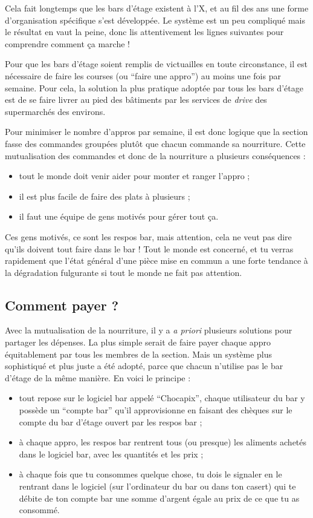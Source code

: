 \documentclass[12pt,french]{article}
\begin{document}
Cela fait longtemps que les bars d'étage existent à l'X, et au fil des ans une forme d'organisation spécifique s'est développée. Le système est un peu compliqué mais le résultat en vaut la peine, donc lis attentivement les lignes suivantes pour comprendre comment ça marche !

Pour que les bars d'étage soient remplis de victuailles en toute circonstance, il est nécessaire de faire les courses (ou \enquote{faire une appro}) au moins une fois par semaine. Pour cela, la solution la plus pratique adoptée par tous les bars d'étage est de se faire livrer au pied des bâtiments par les services de \emph{drive} des supermarchés des environs.

Pour minimiser le nombre d'appros par semaine, il est donc logique que la section fasse des commandes groupées plutôt que chacun commande sa nourriture. Cette mutualisation des commandes et donc de la nourriture a plusieurs conséquences :
\begin{itemize}
	\item tout le monde doit venir aider pour monter et ranger l'appro ;
	\item il est plus facile de faire des plats à plusieurs ;
	\item il faut une équipe de gens motivés pour gérer tout ça.
\end{itemize}

Ces gens motivés, ce sont les respos bar, mais attention, cela ne veut pas dire qu'ils doivent tout faire dans le bar ! Tout le monde est concerné, et tu verras rapidement que l'état général d'une pièce mise en commun a une forte tendance à la dégradation fulgurante si tout le monde ne fait pas attention.

\subsection{Comment payer ?}

Avec la mutualisation de la nourriture, il y a \emph{a priori} plusieurs solutions pour partager les dépenses. La plus simple serait de faire payer chaque appro équitablement par tous les membres de la section. Mais un système plus sophistiqué et plus juste a été adopté, parce que chacun n'utilise pas le bar d'étage de la même manière. En voici le principe :
\begin{itemize}
	\item tout repose sur le logiciel bar appelé \enquote{Chocapix}, chaque utilisateur du bar y possède un \enquote{compte bar} qu'il approvisionne en faisant des chèques sur le compte du bar d'étage ouvert par les respos bar ;
	\item à chaque appro, les respos bar rentrent tous (ou presque) les aliments achetés dans le logiciel bar, avec les quantités et les prix ;
	\item à chaque fois que tu consommes quelque chose, tu dois le signaler en le rentrant dans le logiciel (sur l'ordinateur du bar ou dans ton casert) qui te débite de ton compte bar une somme d'argent égale au prix de ce que tu as consommé.
\end{itemize}
\end{document}
